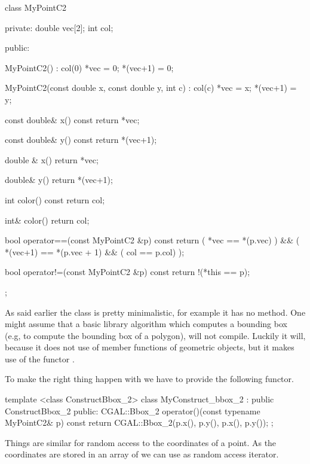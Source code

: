 \ccHtmlLinksOff
\begin{ccExampleCode}
class MyPointC2 {

private:
  double vec[2];
  int col;

public:

  MyPointC2()
    : col(0)
  {
    *vec = 0;
    *(vec+1) = 0;
  }

  
  MyPointC2(const double x, const double y, int c)
    : col(c)
  {
    *vec = x;
    *(vec+1) = y;
  }

  const double& x() const  { return *vec; }

  const double& y() const { return *(vec+1); }

  double & x() { return *vec; }

  double& y() { return *(vec+1); }

  int color() const { return col; }

  int& color() { return col; }
  
  
  bool operator==(const MyPointC2 &p) const
  {
    return ( *vec == *(p.vec) )  && ( *(vec+1) == *(p.vec + 1) && ( col == p.col) );
  }

  bool operator!=(const MyPointC2 &p) const
  {
      return !(*this == p);
  }

};
\end{ccExampleCode}
\ccHtmlLinksOn


As said earlier the class is pretty minimalistic, for
example it has no  method.  One
might assume that a basic library algorithm which computes 
a bounding box (e.g, to compute the bounding box of a polygon),
will not compile. Luckily it will, because it does not
use of member functions of geometric objects, but it makes
use of the functor .

To make the right thing happen with  we
have to provide the following functor.

\ccHtmlLinksOff
\begin{ccExampleCode}
template <class ConstructBbox_2>
class MyConstruct_bbox_2 : public ConstructBbox_2 {
public:
  CGAL::Bbox_2 operator()(const typename MyPointC2& p) const {
    return CGAL::Bbox_2(p.x(), p.y(), p.x(), p.y());
  }
};
\end{ccExampleCode}
\ccHtmlLinksOn


Things are similar for random access to the 
coordinates of a point. As the coordinates are stored
in an array of  we can use  as
random access iterator.

